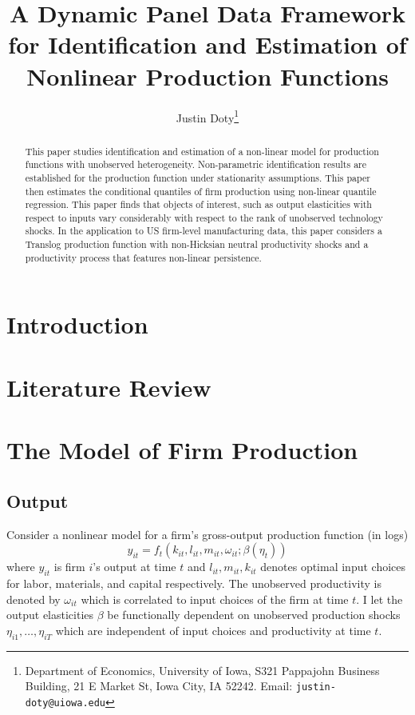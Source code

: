 \documentclass{article}
\title{A Dynamic Panel Data Framework for Identification and Estimation of Nonlinear Production Functions}
\author{Justin Doty\thanks{Department of Economics, University of Iowa, S321 Pappajohn Business Building, 21 E Market St, Iowa City, IA 52242. Email: \texttt{justin-doty@uiowa.edu}}
}
\date{\vspace{-5ex}}
\begin{document}
\maketitle{}

\begin{abstract}
This paper studies identification and estimation of a non-linear model for production functions with unobserved heterogeneity. Non-parametric identification results are established for the production function under stationarity assumptions. This paper then estimates the conditional quantiles of firm production using non-linear quantile regression. This paper finds that objects of interest, such as output elasticities with respect to inputs vary considerably with respect to the rank of unobserved technology shocks. In the application to US firm-level manufacturing data, this paper considers a Translog production function with non-Hicksian neutral productivity shocks and a productivity process that features non-linear persistence.
\end{abstract}

\section{Introduction}

\section{Literature Review}

\section{The Model of Firm Production} \label{model}

\subsection*{Output}
Consider a nonlinear model for a firm's gross-output production function (in logs)
\begin{equation}\label{modelY}
y_{it}=f_{t}(k_{it}, l_{it}, m_{it}, \omega_{it}; \beta(\eta_{t}))
\end{equation}
where $y_{it}$ is firm $i$'s output at time $t$ and $l_{it}, m_{it}, k_{it}$ denotes optimal input choices for labor, materials, and capital respectively. The unobserved productivity is denoted by $\omega_{it}$ which is correlated to input choices of the firm at time $t$. I let the output elasticities $\beta$ be functionally dependent on unobserved production shocks $\eta_{i1},\dots, \eta_{iT}$ which are independent of input choices and productivity at time $t$.\\
\end{document}
